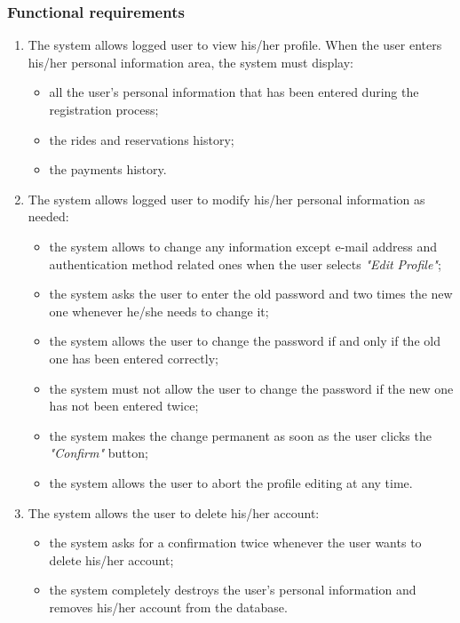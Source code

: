 \subsubsection{Functional requirements}
\begin{enumerate}
\item The system allows logged user to view his/her profile. When the user enters his/her personal information area, the system must display:
	\begin{itemize}
	\item all the user's personal information that has been entered during the registration process;
	\item the rides and reservations history;
	\item the payments history.
	\end{itemize}
\item The system allows logged user to modify his/her personal information as needed:
	\begin{itemize}
	\item the system allows to change any information except e-mail address and authentication method related ones when the user selects \emph{"Edit Profile"};
	\item the system asks the user to enter the old password and two times the new one whenever he/she needs to change it;
	\item the system allows the user to change the password if and only if the old one has been entered correctly;
	\item the system must not allow the user to change the password if the new one has not been entered twice;
	\item the system makes the change permanent as soon as the user clicks the \emph{"Confirm"} button;
	\item the system allows the user to abort the profile editing at any time.
	\end{itemize}
\item The system allows the user to delete his/her account:
	\begin{itemize}
	\item the system asks for a confirmation twice whenever the user wants to delete his/her account;
	\item the system completely destroys the user's personal information and removes his/her account from the database.
	\end{itemize}
\end{enumerate}


